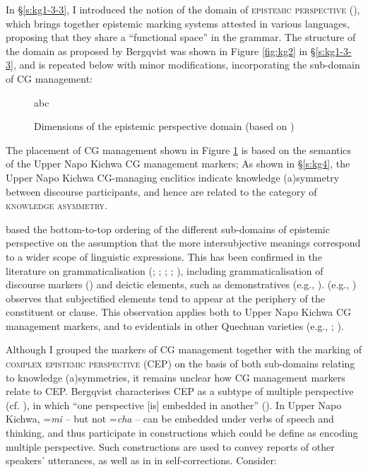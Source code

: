 \documentclass[output=paper]{langscibook}
\begin{document}
In §\ref{s:kg1-3-3}, I introduced the notion of the domain of \textsc{epistemic perspective} (\citealt{Bergqvist2017}), which brings together epistemic marking systems attested in various languages, proposing that they share a “functional space” in the grammar. The structure of the domain as proposed by Bergqvist was shown in Figure \ref{fig:kg2} in §\ref{s:kg1-3-3}‎, and is repeated below with minor modifications, incorporating the sub-domain of CG management:

\begin{figure}
abc
\caption{Dimensions of the epistemic perspective domain (based on \citealt[12]{Bergqvist2017})}
\label{fig:kg4}
\end{figure}

The placement of CG management shown in Figure \ref{fig:kg4} is based on the semantics of the Upper Napo Kichwa CG management markers; As shown in §‎\ref{s:kg4}, the Upper Napo Kichwa CG-managing enclitics indicate knowledge (a)symmetry between discourse participants, and hence are related to the category of \textsc{knowledge asymmetry}.

\cite{Bergqvist2017} based the bottom-to-top ordering of the different sub-domains of epistemic perspective on the assumption that the more intersubjective meanings correspond to a wider scope of linguistic expressions. This has been confirmed in the literature on grammaticalisation (\citealt{Traugott1995}; \citeyear{Traugott2003}; \citeyear{Traugott2010}; \citeyear{Traugott2012}; \citealt{Traugott2002}), including grammaticalisation of discourse markers (\citealt{Traugott1995}) and deictic elements, such as demonstratives (e.g., \citealt{Kratochvil2011}). \citeauthor{Traugott2010} (e.g., \citeyear{Traugott2010}) observes that subjectified elements tend to appear at the periphery of the constituent or clause. This observation applies both to Upper Napo Kichwa CG management markers, and to evidentials in other Quechuan varieties (e.g., \citealt{Muysken1995}; \citealt{Sanchez2015}).

Although I grouped the markers of CG management together with the marking of \textsc{complex epistemic perspective} (CEP) on the basis of both sub-domains relating to knowledge (a)symmetries, it remains unclear how CG management markers relate to CEP. Bergqvist characterises CEP as a subtype of multiple perspective (cf. \citealt{Evans2005}), in which “one perspective [is] embedded in another” (\citealt[6]{Bergqvist2017}). In Upper Napo Kichwa, =\textit{mi} – but not =\textit{cha} – can be embedded under verbs of speech and thinking, and thus participate in constructions which could be define as encoding multiple perspective. Such constructions are used to convey reports of other speakers’ utterances, as well as in in self-corrections. Consider:
\end{document}
